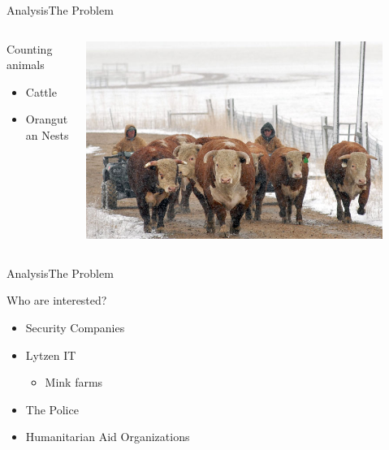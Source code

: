 \begin{frame}{Analysis}{The Problem}
    \begin{columns}[T]
        \begin{column}{.35\textwidth}
            \begin{block}{Counting animals}
                \begin{itemize}
                    \item Cattle
                    \item Orangutan Nests
                \end{itemize}
            \end{block}
        \end{column}
        \begin{column}{.65\textwidth}
            \includegraphics[width=0.9\textwidth]{images/cattle-management.jpg}
        \end{column}
    \end{columns}
\end{frame}

\begin{frame}{Analysis}{The Problem}
    \begin{block}{Who are interested?}
    \begin{itemize}
        \item Security Companies
        \item Lytzen IT
        \begin{itemize}
            \item Mink farms
        \end{itemize}
        \item The Police
        \item Humanitarian Aid Organizations
    \end{itemize}
    \end{block}
\end{frame}

